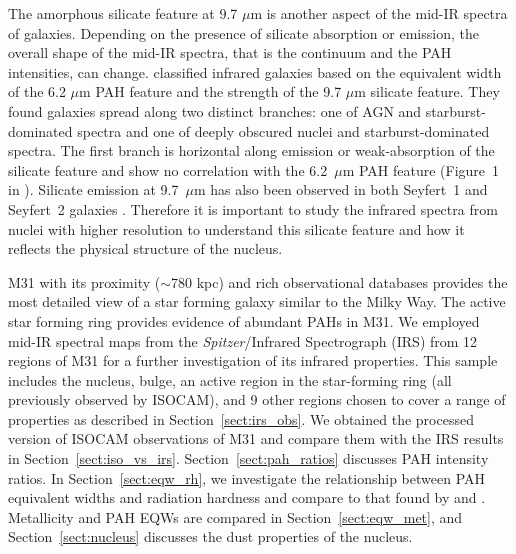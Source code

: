 The amorphous silicate feature at 9.7 $\mu$m is another aspect of the mid-IR spectra of galaxies. Depending on the presence of silicate 
absorption or emission, the overall shape of the mid-IR spectra, that is the continuum and the PAH intensities, can change. \citet{Spoon2007} 
classified infrared galaxies based on the equivalent width of the 6.2 $\mu$m PAH feature and the strength of the 9.7 $\mu$m silicate feature. 
They  found galaxies spread along two distinct branches: one of AGN and starburst-dominated spectra and one of deeply obscured 
nuclei and starburst-dominated spectra. The first branch is horizontal along emission or weak-absorption of the silicate feature and show no 
correlation with the 6.2~$\mu$m PAH feature (Figure~1 in \citet{Spoon2007}). Silicate emission at 9.7~$\mu$m has also been observed in both 
Seyfert~1 and Seyfert~2 galaxies \citep{Mason2009}. Therefore it is important to study the infrared spectra from nuclei with higher resolution 
to understand this silicate feature and how it reflects the physical structure of the nucleus. 

M31 with its proximity ($\sim$780 kpc) and rich observational databases provides the most detailed view of a star forming galaxy similar 
to the Milky Way. The active star forming ring \citep{Barmby2006lr} provides evidence of abundant PAHs in M31. 
We employed mid-IR spectral maps from the {\em Spitzer}/Infrared Spectrograph (IRS) from 12 regions of M31 for a further investigation of 
its infrared properties. This sample includes the nucleus, bulge, an active region in the star-forming ring (all previously observed by ISOCAM), and 9 
other regions chosen to cover a range of properties as described in Section~\ref{sect:irs_obs}. 
We obtained the processed version of ISOCAM observations of M31 and compare them with the IRS results in Section~\ref{sect:iso_vs_irs}. 
Section~\ref{sect:pah_ratios} discusses PAH intensity ratios.
In Section~\ref{sect:eqw_rh}, we investigate the relationship between PAH equivalent widths and radiation 
hardness and compare to that found by \citet{Engelbracht_2008} and \citet{Gordon:2008lr}. Metallicity and PAH EQWs are compared in 
Section~\ref{sect:eqw_met}, and Section~\ref{sect:nucleus} discusses the dust properties of the nucleus. 	
